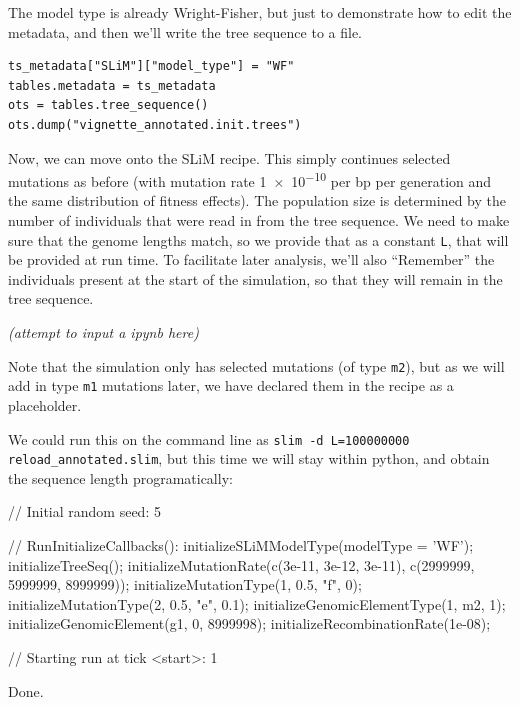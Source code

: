 \documentclass[12pt]{article}
\newcommand{\comment}[1]{\textit{\color{green} #1}}
\begin{document}
The model type is already Wright-Fisher,
but just to demonstrate how to edit the metadata,
and then we’ll write the tree sequence to a file.

\begin{listing}[H]
    \begin{verbatim}
ts_metadata["SLiM"]["model_type"] = "WF"
tables.metadata = ts_metadata
ots = tables.tree_sequence()
ots.dump("vignette_annotated.init.trees")
    \end{verbatim}
\end{listing}   

Now, we can move onto the SLiM recipe.
This simply continues selected mutations as before (with mutation rate \num{1e-10} per bp per generation and the same distribution of fitness effects).
The population size is determined by the number of individuals that were read in from the tree sequence.
We need to make sure that the genome lengths match, so we provide that as a constant \verb|L|, that will be provided at run time.
To facilitate later analysis, we’ll also “Remember” the individuals present at the start of the simulation,
so that they will remain in the tree sequence.

\comment{(attempt to input a ipynb here)}

Note that the simulation only has selected mutations (of type \verb|m2|),
but as we will add in type \verb|m1| mutations later,
we have declared them in the recipe as a placeholder.

We could run this on the command line as \verb|slim -d L=100000000 reload_annotated.slim|,
but this time we will stay within python, and obtain the sequence length programatically:

\begin{pycon}
    // Initial random seed:
    5
    
    // RunInitializeCallbacks():
    initializeSLiMModelType(modelType = 'WF');
    initializeTreeSeq();
    initializeMutationRate(c(3e-11, 3e-12, 3e-11), c(2999999, 5999999, 8999999));
    initializeMutationType(1, 0.5, "f", 0);
    initializeMutationType(2, 0.5, "e", 0.1);
    initializeGenomicElementType(1, m2, 1);
    initializeGenomicElement(g1, 0, 8999998);
    initializeRecombinationRate(1e-08);
    
    // Starting run at tick <start>:
    1 
    
    Done.
\end{pycon}
\end{document}

